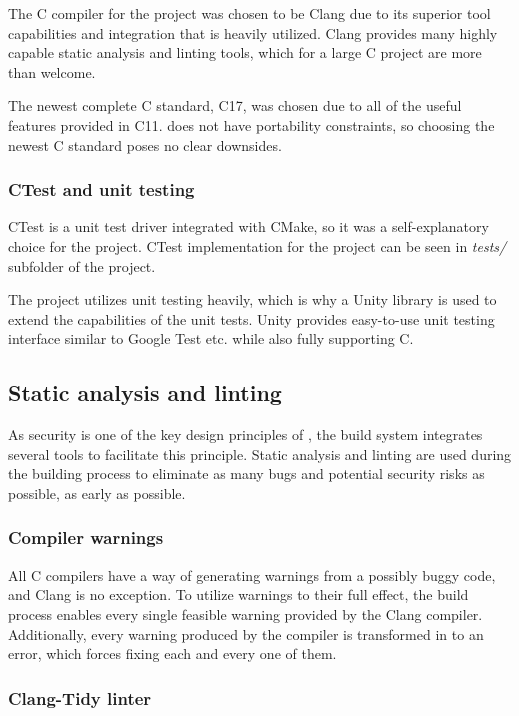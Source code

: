 The C compiler for the project was chosen to be Clang due to its superior tool
capabilities and integration that is heavily utilized. Clang provides many
highly capable static analysis and linting tools, which for a large C project
are more than welcome.

The newest complete C standard, C17, was chosen due to all of the useful
features provided in C11. \pman does not have portability constraints,
so choosing the newest C standard poses no clear downsides.

\subsubsection{CTest and unit testing}

CTest is a unit test driver integrated with CMake, so it was a self-explanatory
choice for the project. CTest implementation for the project can be seen in
\textit{tests/} subfolder of the project.

The \pman project utilizes unit testing heavily, which is why a Unity
library is used to extend the capabilities of the unit tests. Unity provides
easy-to-use unit testing interface similar to Google Test etc. while also fully
supporting C.

\subsection{Static analysis and linting}

As security is one of the key design principles of \pman, the build
system integrates several tools to facilitate this principle. Static analysis
and linting are used during the building process to eliminate as many bugs and
potential security risks as possible, as early as possible.

\subsubsection{Compiler warnings}

All C compilers have a way of generating warnings from a possibly buggy code,
and Clang is no exception. To utilize warnings to their full effect, the
\pman build process enables every single feasible warning provided by
the Clang compiler. Additionally, every warning produced by the compiler is
transformed in to an error, which forces fixing each and every one of them.

\subsubsection{Clang-Tidy linter}

